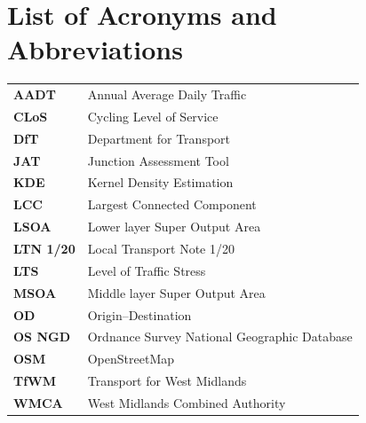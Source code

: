 \chapter*{List of Acronyms and Abbreviations}

\begin{table}[H]
\begin{tabularx}{\textwidth}{l X}
\textbf{AADT}    & Annual Average Daily Traffic \\
\textbf{CLoS}    & Cycling Level of Service \\
\textbf{DfT}    & Department for Transport \\
\textbf{JAT}     & Junction Assessment Tool \\
\textbf{KDE}     & Kernel Density Estimation \\
\textbf{LCC}     & Largest Connected Component \\
\textbf{LSOA}    & Lower layer Super Output Area \\
\textbf{LTN 1/20}& Local Transport Note 1/20 \\
\textbf{LTS}     & Level of Traffic Stress \\
\textbf{MSOA}    & Middle layer Super Output Area \\
\textbf{OD}      & Origin--Destination \\
\textbf{OS NGD}  & Ordnance Survey National Geographic Database \\
\textbf{OSM}     & OpenStreetMap \\
\textbf{TfWM}    & Transport for West Midlands \\
\textbf{WMCA}    & West Midlands Combined Authority \\
\end{tabularx}
\end{table}

\newpage
